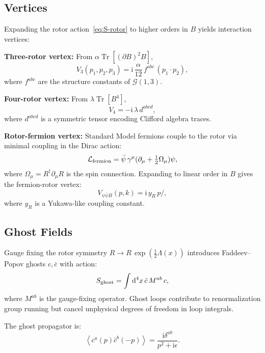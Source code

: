 \documentclass[11pt,a4paper]{article}
\numberwithin{equation}{section}
\theoremstyle{plain}
\theoremstyle{definition}
\theoremstyle{remark}
\DeclareMathOperator{\Tr}{Tr}
\newcommand{\dd}{\mathrm{d}}
\newcommand{\ii}{\mathrm{i}}
\newcommand{\avg}[1]{\left\langle #1 \right\rangle}
\newcommand{\Cl}{\mathcal{G}}               %
\newcommand{\Lag}{\mathcal{L}}              %
\begin{document}
\subsection{Vertices}

Expanding the rotor action~\eqref{eq:S-rotor} to higher orders in $B$ yields interaction vertices:

\textbf{Three-rotor vertex:} From $\alpha\Tr[(\partial B)^2 B]$,
\begin{equation}
V_3(p_1,p_2,p_3) = \ii\,\frac{\alpha}{12}\,f^{abc}\,(p_1\cdot p_2),
\label{eq:V3}
\end{equation}
where $f^{abc}$ are the structure constants of $\Cl(1,3)$.

\textbf{Four-rotor vertex:} From $\lambda\Tr[B^4]$,
\begin{equation}
V_4 = -\ii\,\lambda\,d^{abcd},
\label{eq:V4}
\end{equation}
where $d^{abcd}$ is a symmetric tensor encoding Clifford algebra traces.

\textbf{Rotor-fermion vertex:} Standard Model fermions couple to the rotor via minimal coupling in the Dirac action:
\begin{equation}
\Lag_{\rm fermion} = \bar\psi\,\gamma^\mu(\partial_\mu + \tfrac12 \Omega_\mu)\psi,
\label{eq:L-fermion}
\end{equation}
where $\Omega_\mu = R^\dagger \partial_\mu R$ is the spin connection. Expanding to linear order in $B$ gives the fermion-rotor vertex:
\begin{equation}
V_{\psi\bar\psi B}(p,k) = \ii\,y_R\,p\!\!\!/,
\label{eq:V-fermion}
\end{equation}
where $y_R$ is a Yukawa-like coupling constant.

\subsection{Ghost Fields}

Gauge fixing the rotor symmetry $R\to R\,\exp(\tfrac12\Lambda(x))$ introduces Faddeev--Popov ghosts $c,\bar c$ with action:
\begin{equation}
S_{\rm ghost} = \int \dd^4x\,\bar c\,M^{ab}\,c,
\label{eq:S-ghost}
\end{equation}
where $M^{ab}$ is the gauge-fixing operator. Ghost loops contribute to renormalization group running but cancel unphysical degrees of freedom in loop integrals.

The ghost propagator is:
\begin{equation}
\avg{c^a(p)\bar c^b(-p)} = \frac{\ii\delta^{ab}}{p^2+\ii\epsilon}.
\label{eq:prop-ghost}
\end{equation}
\end{document}
